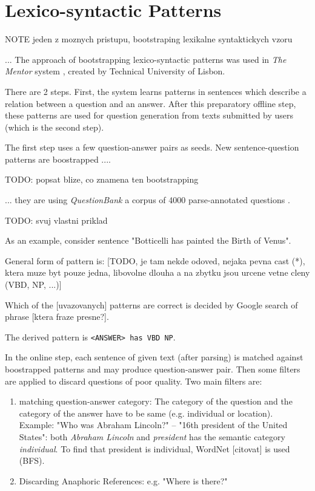 \documentclass[a4paper, 12pt, twoside]{fithesis2}		%
\renewcommand{\_}{\leavevmode \kern0.0em\vbox{\hrule width0.4em}}
\begin{document}
\section{Lexico-syntactic Patterns}
\label{sec:lexico-syntactic-patterns}


NOTE jeden z moznych pristupu, bootstraping lexikalne syntaktickych vzoru

... The approach of bootstrapping lexico-syntactic patterns was used
in \textit{The Mentor} system \cite{mentor}, created by Technical University of Lisbon.

There are 2 steps.
First, the system learns patterns in sentences which describe a relation between a question and an answer.
After this preparatory offline step, these patterns are used for question generation from texts submitted by users (which is the second step).

The first step uses a few question-answer pairs as seeds.
New sentence-question patterns are boostrapped ....

TODO: popsat blize, co znamena ten bootstrapping

... they are using \textit{QuestionBank} a corpus of 4000 parse-annotated questions \cite{question-bank}.

TODO: svuj vlastni priklad

As an example, consider sentence "Botticelli has painted the Birth of Venus".

General form of pattern is: [TODO, je tam nekde odoved, nejaka pevna cast (*), ktera muze byt pouze jedna, libovolne dlouha a na zbytku jsou urcene vetne cleny (VBD, NP, ...)]

Which of the [uvazovanych] patterns are correct is decided by
Google search of phrase [ktera fraze presne?].

The derived pattern is \texttt{<ANSWER> has VBD NP}.



In the online step, each sentence of given text (after parsing) is matched against boostrapped patterns
and may produce question-answer pair.
Then some filters are applied to discard questions of poor quality. Two main filters are:

\begin{enumerate}
  \item matching question-answer category:
    The category of the question and the category of the answer have to be same (e.g. individual or location). Example: "Who was Abraham Lincoln?" -- "16th president of the United States": both \textit{Abraham Lincoln} and \textit{president} has the semantic category \textit{individual}.
    To find that president is individual, WordNet [citovat] is used (BFS).
  \item Discarding Anaphoric References: e.g. "Where is there?"
\end{enumerate}
\end{document}
